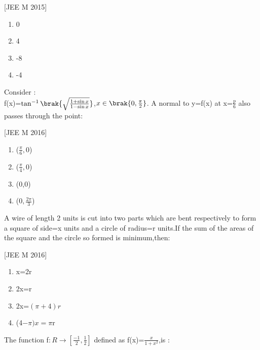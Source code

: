     \hfill[JEE M 2015]\\
\begin{enumerate}
    \item  0\\
    \item  4\\
    \item -8\\
    \item -4\\
\end{enumerate}    
\item[32.] Consider $:$\\
     f(x)=$\tan^{-1}\brak{ \sqrt{\frac{1+\sin{x}}{1-\sin{x}} }}$,$x \in \brak{0,\frac{\pi}{2}}$.
A normal to y=f(x) at x=$\frac{p}{6}$ also passes through the point$:$

\hfill[JEE M 2016]\\
\begin{enumerate}
    \item  ($\frac{\pi}{6},0$)\\
    \item  ($\frac{\pi}{4},0$)\\
    \item  (0,0)\\
    \item  ($0,\frac{2\pi}{3}$)\\
\end{enumerate}
\item[33.] A wire of length 2 units is cut into two parts which are bent respectively to form a square of side=x units and a circle of radius=r units.If the sum of the areas of the square and the circle so formed is minimum,then$:$

\hfill[JEE M 2016]\\
\begin{enumerate}
    \item  x=2r\\
    \item  2x=r\\
    \item  2x=$(\pi+4)r$\\
    \item (4$-\pi)x=\pi$r\\
\end{enumerate}
\item[34.]The function f$: R\rightarrow{[\frac{-1}{2},\frac{1}{2}]}$ defined as f(x)=$\frac{x}{1+x^2}$,is $:$


